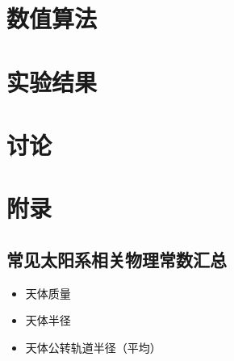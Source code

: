 \documentclass[hidelinks]{article}
\begin{document}
\section{数值算法}

\section{实验结果}

\section{讨论}

\section{附录}
\subsection{常见太阳系相关物理常数汇总}
\begin{itemize}
    \item 天体质量
    \item 天体半径
    \item 天体公转轨道半径（平均）
\end{itemize}
\end{document}
